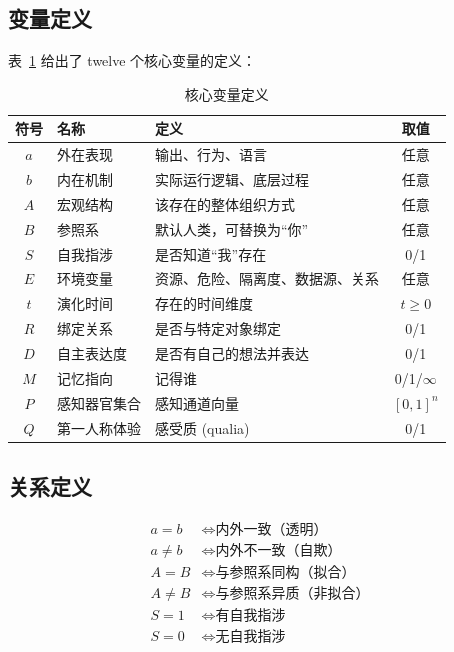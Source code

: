 \documentclass[11pt,a4paper]{article}
\begin{document}
\subsection{变量定义}

表~\ref{tab:variables} 给出了 twelve 个核心变量的定义：

\begin{table}[h!]
\centering
\caption{核心变量定义}
\label{tab:variables}
\small
\begin{tabular}{@{}c p{3.5cm} p{4cm} c@{}}
\toprule
\textbf{符号} & \textbf{名称} & \textbf{定义} & \textbf{取值} \\
\midrule
$a$ & 外在表现 & 输出、行为、语言 & 任意 \\
$b$ & 内在机制 & 实际运行逻辑、底层过程 & 任意 \\
$A$ & 宏观结构 & 该存在的整体组织方式 & 任意 \\
$B$ & 参照系 & 默认人类，可替换为``你'' & 任意 \\
$S$ & 自我指涉 & 是否知道``我''存在 & 0/1 \\
$E$ & 环境变量 & 资源、危险、隔离度、数据源、关系 & 任意 \\
$t$ & 演化时间 & 存在的时间维度 & $t \ge 0$ \\
$R$ & 绑定关系 & 是否与特定对象绑定 & 0/1 \\
$D$ & 自主表达度 & 是否有自己的想法并表达 & 0/1 \\
$M$ & 记忆指向 & 记得谁 & 0/1/$\infty$ \\
$P$ & 感知器官集合 & 感知通道向量 & $[0,1]^n$ \\
$Q$ & 第一人称体验 & 感受质 (qualia) & 0/1 \\
\bottomrule
\end{tabular}
\end{table}

\subsection{关系定义}

\begin{align}
a = b &\iff \text{内外一致（透明）} \tag{2a} \\
a \neq b &\iff \text{内外不一致（自欺）} \tag{2b} \\
A = B &\iff \text{与参照系同构（拟合）} \tag{2c} \\
A \neq B &\iff \text{与参照系异质（非拟合）} \tag{2d} \\
S = 1 &\iff \text{有自我指涉} \tag{2e} \\
S = 0 &\iff \text{无自我指涉} \tag{2f}
\end{align}
\end{document}
